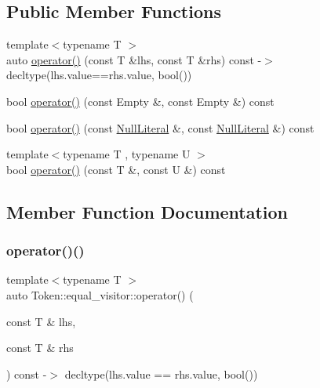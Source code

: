 \subsection*{Public Member Functions}
\begin{DoxyCompactItemize}
\item 
{\footnotesize template$<$typename T $>$ }\\auto \hyperlink{struct_token_1_1equal__visitor_a22bf1a085ca9392c7be2d6a11f07afa5}{operator()} (const T \&lhs, const T \&rhs) const -\/$>$ decltype(lhs.\+value==rhs.\+value, bool())
\item 
bool \hyperlink{struct_token_1_1equal__visitor_a967ea3398b97e8e1af5e52384d5e92f2}{operator()} (const Empty \&, const Empty \&) const
\item 
bool \hyperlink{struct_token_1_1equal__visitor_adcfaf40afbf658dcedcf672c5f94b15d}{operator()} (const \hyperlink{struct_null_literal}{Null\+Literal} \&, const \hyperlink{struct_null_literal}{Null\+Literal} \&) const
\item 
{\footnotesize template$<$typename T , typename U $>$ }\\bool \hyperlink{struct_token_1_1equal__visitor_abd104c4e966e4c0e6d43991816f17118}{operator()} (const T \&, const U \&) const
\end{DoxyCompactItemize}


\subsection{Member Function Documentation}
\mbox{\label{struct_token_1_1equal__visitor_a22bf1a085ca9392c7be2d6a11f07afa5}} 
\subsubsection{\texorpdfstring{operator()()}{operator()()}\hspace{0.1cm}{\footnotesize\ttfamily [1/4]}}
{\footnotesize\ttfamily template$<$typename T $>$ \\
auto Token\+::equal\+\_\+visitor\+::operator() (\begin{DoxyParamCaption}\item[{const T \&}]{lhs,  }\item[{const T \&}]{rhs }\end{DoxyParamCaption}) const -\/$>$ decltype(lhs.\+value == rhs.\+value, bool())
  \hspace{0.3cm}{\ttfamily [inline]}}


